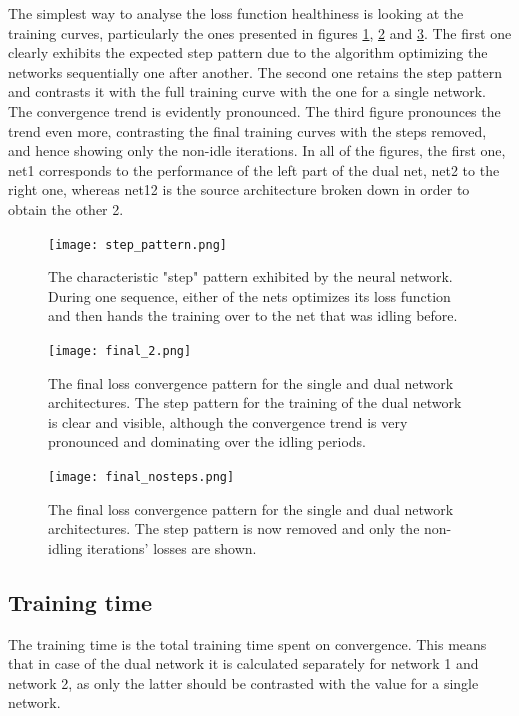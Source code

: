 \documentclass[a4paper, 12pt]{article}
\numberwithin{equation}{section}
\begin{document}
	The simplest way to analyse the loss function healthiness is looking at the training curves, particularly the ones presented in figures \ref{fig:step_pattern}, \ref{fig:final_trace} and \ref{fig:final_trace_nosteps}. The first one clearly exhibits the expected step pattern due to the algorithm optimizing the networks sequentially one after another. The second one retains the step pattern and contrasts it with the full training curve with the one for a single network. The convergence trend is evidently pronounced. The third figure pronounces the trend even more, contrasting the final training curves with the steps removed, and hence showing only the non-idle iterations. In all of the figures, the first one, net1 corresponds to the performance of the left part of the dual net, net2 to the right one, whereas net12 is the source architecture broken down in order to obtain the other 2.

	\begin{figure}[!hb]
		\centering
		\texttt{[image: step\_pattern.png]}
		\caption{\label{fig:step_pattern}{The characteristic "step" pattern exhibited by the neural network. During one sequence, either of the nets optimizes its loss function and then hands the training over to the net that was idling before.}}
	\end{figure}

	\begin{figure}[!hb]
		\centering
		\texttt{[image: final\_2.png]}
		\caption{\label{fig:final_trace}{The final loss convergence pattern for the single and dual network architectures. The step pattern for the training of the dual network is clear and visible, although the convergence trend is very pronounced and dominating over the idling periods.}}
	\end{figure}

	\begin{figure}[!hb]
		\centering
		\texttt{[image: final\_nosteps.png]}
		\caption{\label{fig:final_trace_nosteps}{The final loss convergence pattern for the single and dual network architectures. The step pattern is now removed and only the non-idling iterations' losses are shown.}}
	\end{figure}

	\subsection{Training time}

	The training time is the total training time spent on convergence. This means that in case of the dual network it is calculated separately for network 1 and network 2, as only the latter should be contrasted with the value for a single network.
\end{document}
